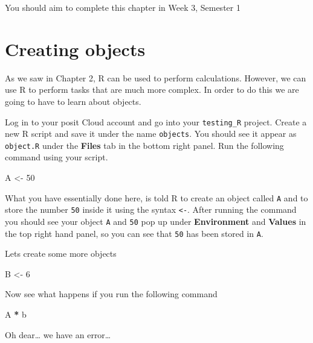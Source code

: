 \documentclass[
]{book}
\newenvironment{Shaded}{\begin{snugshade}}{\end{snugshade}}
\newcommand{\DecValTok}[1]{\textcolor[rgb]{0.00,0.00,0.81}{#1}}
\newcommand{\NormalTok}[1]{#1}
\newcommand{\OtherTok}[1]{\textcolor[rgb]{0.56,0.35,0.01}{#1}}
\newcommand{\SpecialCharTok}[1]{\textcolor[rgb]{0.81,0.36,0.00}{\textbf{#1}}}
\begin{document}
You should aim to complete this chapter in Week 3, Semester 1

\hypertarget{creating-objects}{%
\section{Creating objects}\label{creating-objects}}

As we saw in Chapter 2, R can be used to perform calculations. However, we can use R to perform tasks that are much more complex. In order to do this we are going to have to learn about objects.

Log in to your posit Cloud account and go into your \texttt{testing\_R} project. Create a new R script and save it under the name \texttt{objects}. You should see it appear as \texttt{object.R} under the \textbf{Files} tab in the bottom right panel. Run the following command using your script.

\begin{Shaded}
\begin{Highlighting}[]
\NormalTok{A }\OtherTok{\textless{}{-}} \DecValTok{50}
\end{Highlighting}
\end{Shaded}

What you have essentially done here, is told R to create an object called \texttt{A} and to store the number \texttt{50} inside it using the syntax \texttt{\textless{}-}. After running the command you should see your object \texttt{A} and \texttt{50} pop up under \textbf{Environment} and \textbf{Values} in the top right hand panel, so you can see that \texttt{50} has been stored in \texttt{A}.

Lets create some more objects

\begin{Shaded}
\begin{Highlighting}[]
\NormalTok{B }\OtherTok{\textless{}{-}} \DecValTok{6}
\end{Highlighting}
\end{Shaded}

Now see what happens if you run the following command

\begin{Shaded}
\begin{Highlighting}[]
\NormalTok{A }\SpecialCharTok{*}\NormalTok{ b}
\end{Highlighting}
\end{Shaded}

Oh dear\ldots{} we have an error\ldots{}
\end{document}
